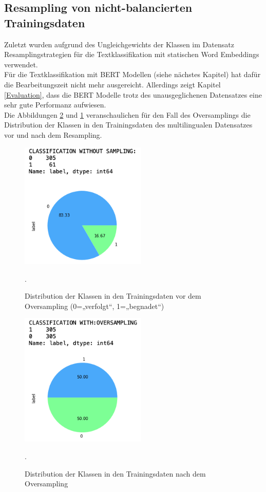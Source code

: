 \documentclass[ngerman]{ttlab-qualify}
\begin{document}
\subsection{Resampling von nicht-balancierten Trainingsdaten}
Zuletzt wurden aufgrund des Ungleichgewichts der Klassen im Datensatz Resamplingstrategien für die Textklassifikation mit statischen Word Embeddings verwendet.\\ Für die Textklassifikation mit BERT Modellen (siehe nächstes Kapitel) hat dafür die Bearbeitungszeit nicht mehr ausgereicht. Allerdings zeigt Kapitel \ref{Evaluation}, dass die BERT Modelle trotz des unausgeglichenen Datensatzes eine sehr gute Performanz aufwiesen.\\
Die Abbildungen \ref{with_oversampling} und \ref{without_oversampling} veranschaulichen für den Fall des Oversamplings die Distribution der Klassen in den Trainingsdaten des multilingualen Datensatzes vor und nach dem Resampling.
\begin{figure}[H]
\begin{center}
\includegraphics[width=6cm]{grafiken/without_oversampling.png}
\caption[Distribution der Klassen in den Trainingsdaten vor dem Oversampling]{Distribution der Klassen in den Trainingsdaten vor dem Oversampling (0=„verfolgt“, 1=„begnadet“)}.
\label{without_oversampling}
\end{center}
\end{figure} 

\begin{figure}[H]
\begin{center}
\includegraphics[width=6cm]{grafiken/with_oversampling.png}
\caption[Distribution der Klassen in den Trainingsdaten nach dem Oversampling]{Distribution der Klassen in den Trainingsdaten nach dem Oversampling}.
\label{with_oversampling}
\end{center}
\end{figure}
\newpage
\end{document}
